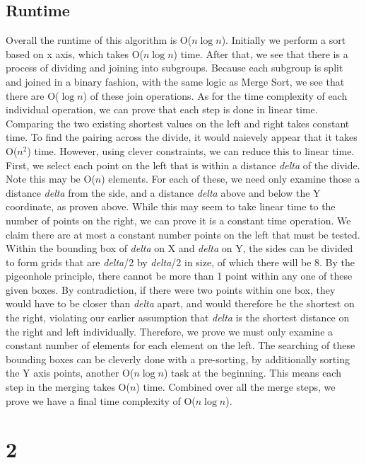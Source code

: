 \documentclass[titlepage]{article}
\numberwithin{equation}{subsection}
\begin{document}
\subsection{Runtime}
Overall the runtime of this algorithm is O($n\log n$). Initially we perform a sort based on x axis, which takes
O($n\log n$) time. After that, we see that there is a process of dividing and joining into subgroups. Because 
each subgroup is split and joined in a binary fashion, with the same logic as Merge Sort, we see that there 
are O($\log n$) of these join operations. As for the time complexity of each individual operation, we can prove that
each step is done in linear time. Comparing the two existing shortest values on the left and right takes constant
time. To find the pairing across the divide, it would naievely appear that it takes O($n^{2}$) time. However, using
clever constraints, we can reduce this to linear time. First, we select each point on the left that is within
a distance \textit{delta} of the divide. Note this may be O($n$) elements. For each of these, we need only examine
those a distance \textit{delta} from the side, and a distance \textit{delta} above and below the Y coordinate, as
proven above. While this may seem to take linear time to the number of points on the right, we can prove it is
a constant time operation. We claim there are at most a constant number points on the left that must be tested. 
Within the bounding box of \textit{delta} on X and \textit{delta} on Y, the sides can be divided to form grids
that are \textit{delta}/2 by \textit{delta}/2 in size, of which there will be 8. By the pigeonhole principle,
there cannot be more than 1 point within any one of these given boxes. By contradiction, if there were two points
within one box, they would have to be closer than \textit{delta} apart, and would therefore be the shortest on the
right, violating our earlier assumption that \textit{delta} is the shortest distance on the right and left individually.
Therefore, we prove we must only examine a constant number of elements for each element on the left. The searching
of these bounding boxes can be cleverly done with a pre-sorting, by additionally sorting the Y axis points, another
O($n\log n$) task at the beginning. This means each step in the merging takes O($n$) time. Combined over all the
merge steps, we prove we have a final time complexity of O($n\log n$).
\section{2}
\end{document}
